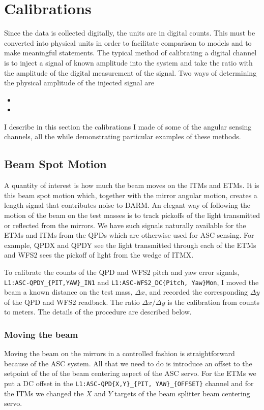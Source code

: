 \section{Calibrations}
Since the data is collected digitally, the units are in digital
counts. This must be converted into physical units in order to
facilitate comparison to models and to make meaningful statements. The
typical method of calibrating a digital channel is to inject a signal
of known amplitude into the system and take the ratio with the
amplitude of the digital measurement of the signal. Two ways of
determining the physical amplitude of the injected signal are
\begin{itemize}
\item 
\item 
\end{itemize}
I describe in this section the calibrations I made of some of the
angular sensing channels, all the while demonstrating particular
examples of these methods.


\subsection{Beam Spot Motion}
A quantity of interest is how much the beam moves on the ITMs and
ETMs. It is this beam spot motion which, together with the mirror
angular motion, creates a length signal that contributes noise to
DARM. An elegant way of following the motion of the beam on the test
masses is to track pickoffs of the light transmitted or reflected from
the mirrors. We have such signals naturally available for the ETMs and
ITMs from the QPDs which are otherwise used for ASC sensing. For
example, QPDX and QPDY see the light transmitted through each of the
ETMs and WFS2 sees the pickoff of light from the wedge of ITMX.

To calibrate the counts of the QPD and WFS2 pitch and yaw error
signals, \linebreak \texttt{L1:ASC-QPDY\_\{PIT,YAW\}\_IN1} and
\texttt{L1:ASC-WFS2\_DC\{Pitch, Yaw\}Mon}, I moved the beam a
known distance on the test mass, $\Delta x$, and recorded the
corresponding $\Delta y$ of the QPD and WFS2 readback. The ratio
$\Delta x /\Delta y$ is the calibration from counts to meters. The
details of the procedure are described below.


\subsubsection{Moving the beam} 
Moving the beam on the mirrors in a controlled fashion is
straightforward because of the ASC system. All that we need to do is
introduce an offset to the setpoint of the of the beam centering
aspect of the ASC servo. For the ETMs we put a DC offset in the
\texttt{L1:ASC-QPD\{X,Y\}\_\{PIT, YAW\}\_\{OFFSET\}} channel and for
the ITMs we changed the $X$ and $Y$ targets of the beam splitter beam
centering servo.

